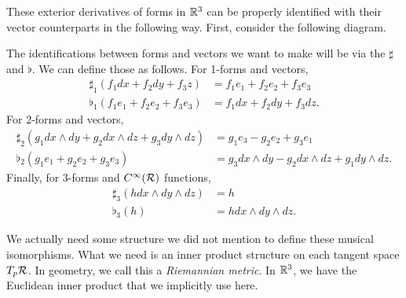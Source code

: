 These exterior derivatives of forms in $\mathbb{R}^3$ can be properly identified with their vector counterparts in the following way.  First, consider the following diagram.
\begin{center}
\end{center}
\noindent The identifications between forms and vectors we want to make will be via the  $\sharp$ and $\flat$.  We can define those as follows. For 1-forms and vectors,
\begin{align*}
    \sharp_1 (f_1 dx + f_2 dy + f_3 z) &= f_1 e_1 + f_2 e_2 + f_3 e_3\\
    \flat_1 (f_1 e_1 + f_2 e_2 + f_3 e_3) &= f_1 dx + f_2 dy + f_3 dz.
\end{align*}
\noindent For 2-forms and vectors,
\begin{align*}
    \sharp_2 ( g_1 dx\wedge dy + g_2 dx\wedge dz + g_3 dy\wedge dz) &= g_1e_3-g_2e_2+g_3e_1\\
    \flat_2 (g_1 e_1 + g_2e_2 + g_3 e_3) &= g_3 dx \wedge dy - g_2 dx\wedge dz + g_1 dy \wedge dz.
\end{align*}
Finally, for 3-forms and $C^\infty(\mathcal{R})$ functions,
\begin{align*}
    \sharp_3 (h dx\wedge dy \wedge dz) &= h\\
    \flat_3 (h) &= hdx\wedge dy\wedge dz.
\end{align*}

\begin{remark}
We actually need some structure we did not mention to define these musical isomorphisms. What we need is an inner product structure on each tangent space $T_p\mathcal{R}$.  In geometry, we call this a \emph{Riemannian metric}.  In $\mathbb{R}^3$, we have the Euclidean inner product that we implicitly use here.
\end{remark}

